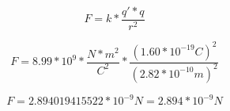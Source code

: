 \documentclass[11pt]{article}
\begin{document}
	\begin{equation}
		F = k * \frac{q'*q}{r^2}
	\end{equation}
	
	\begin{equation}
		F = 8.99 * 10^9*\frac{N*m^2}{C^2}*\frac{(1.60*10^{-19}C)^2}{(2.82*10^{-10}m)^2}
	\end{equation}
	
	\begin{equation}
		F = 2.894019415522 * 10^{-9}N = 2.894 * 10^{-9}N
	\end{equation}
\end{document}
